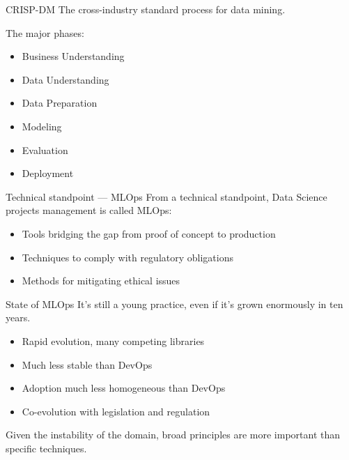 \begin{frame}{CRISP-DM}
  The cross-industry standard process for data mining.

  The major phases:
  \begin{itemize}
  \item Business Understanding
  \item Data Understanding
  \item Data Preparation
  \item Modeling
  \item Evaluation
  \item Deployment
  \end{itemize}
\end{frame}

\begin{frame}{Technical standpoint — MLOps}
  From a technical standpoint, Data Science projects management is called MLOps:

  \begin{itemize}
    \item Tools bridging the gap from proof of concept to production
    \item Techniques to comply with regulatory obligations
    \item Methods for mitigating ethical issues
  \end{itemize}

  \hugo
\end{frame}

\begin{frame}{State of MLOps}
  It's still a young practice, even if it's grown enormously in ten years.
  \begin{itemize}
    \item Rapid evolution, many competing libraries
    \item Much less stable than DevOps
    \item Adoption much less homogeneous than DevOps
    \item Co-evolution with legislation and regulation
  \end{itemize}
  Given the instability of the domain, broad principles are more
  important than specific techniques.

  \hugo
\end{frame}




